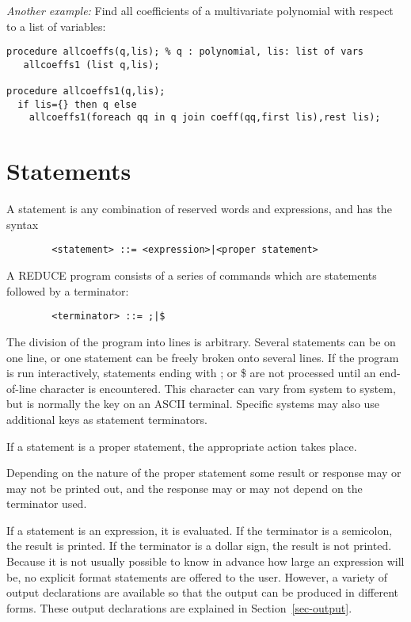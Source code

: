 \documentclass[11pt,letterpaper]{book}
\newcommand{\REDUCE}{REDUCE}
\newcommand{\key}[1]{\fbox{\sf #1}}
\begin{document}
{\it Another example:} Find all coefficients of a multivariate
polynomial with respect to a list of variables:

{\small\begin{verbatim}
procedure allcoeffs(q,lis); % q : polynomial, lis: list of vars
   allcoeffs1 (list q,lis);

procedure allcoeffs1(q,lis);
  if lis={} then q else
    allcoeffs1(foreach qq in q join coeff(qq,first lis),rest lis);

\end{verbatim}}

\chapter{Statements}

A statement is any combination of reserved words and
expressions, and has the syntax 
{\small\begin{verbatim}
        <statement> ::= <expression>|<proper statement>
\end{verbatim}}
A {\REDUCE} program consists of a series of commands which are statements
followed by a terminator:
{\small\begin{verbatim}
        <terminator> ::= ;|$
\end{verbatim}}
The division of the program into lines is arbitrary. Several statements
can be on one line, or one statement can be freely broken onto several
lines. If the program is run interactively, statements ending with ; or \$
are not processed until an end-of-line character is encountered. This
character can vary from system to system, but is normally the \key{Return}
key on an ASCII terminal.  Specific systems may also use additional keys
as statement terminators.

If a statement is a proper statement, the
appropriate action takes place.

Depending on the nature of the proper statement some result or response may
or may not be printed out, and the response may or may not depend on the
terminator used.

If a statement is an expression, it is evaluated. If the terminator is a
semicolon, the result is printed. If the terminator is a dollar sign, the
result is not printed. Because it is not usually possible to know in
advance how large an expression will be, no explicit format statements are
offered to the user. However, a variety of output declarations are
available so that the output can be produced in different forms. These
output declarations are explained in Section~\ref{sec-output}.
\end{document}
